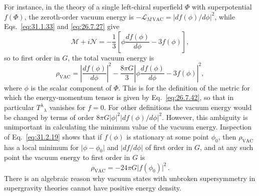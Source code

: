 For instance, in the theory of a single left-chiral superfield \(\Phi\) with
superpotential \(f(\Phi)\), the zeroth-order vacuum energy is
\(-\mathcal L_{M\,\mathrm{VAC}}=\lvert df(\phi)/d\phi\rvert^2\), while
Eqs.~\eqref{eq:31.1.33} and \eqref{eq:26.7.27} give
\[
  \mathcal M+i\mathcal N
  =-\frac13\left[
    \phi\frac{df(\phi)}{d\phi}-3f(\phi)
  \right],
\]
so to first order in \(G\), the total vacuum energy is
\begin{equation}
  \rho_{\mathrm{VAC}}
  =\left\lvert\frac{df(\phi)}{d\phi}\right\rvert^2
   -\frac{8\pi G}{3}
    \left\lvert
      \phi\frac{df(\phi)}{d\phi}-3f(\phi)
    \right\rvert^2,
  \tag{31.2.19}\label{eq:31.2.19}
\end{equation}
where \(\phi\) is the scalar component of \(\Phi\). This is for the definition
of the metric for which the energy-momentum tensor is given by
Eq.~\eqref{eq:26.7.42}, so that in particular \(T^\lambda{}_\lambda\)
vanishes for \(f=0\). For other definitions the vacuum energy would be
changed by terms of order
\(8\pi G\lvert\phi\rvert^2\lvert df(\phi)/d\phi\rvert^2\). However, this
ambiguity is unimportant in calculating the minimum value of the vacuum
energy. Inspection of Eq.~\eqref{eq:31.2.19} shows that if \(f(\phi)\) is
stationary at some point \(\phi_0\), then \(\rho_{\mathrm{VAC}}\) has a local
minimum for \(\lvert\phi-\phi_0\rvert\) and \(\lvert df/d\phi\rvert\) of first
order in \(G\), and at any such point the vacuum energy to first order in
\(G\) is
\begin{equation}
  \rho_{\mathrm{VAC}}=-24\pi G\lvert f(\phi_0)\rvert^2\,.
  \tag{31.2.20}\label{eq:31.2.20}
\end{equation}
There is an algebraic reason why vacuum states with unbroken supersymmetry in
supergravity theories cannot have positive energy density.

